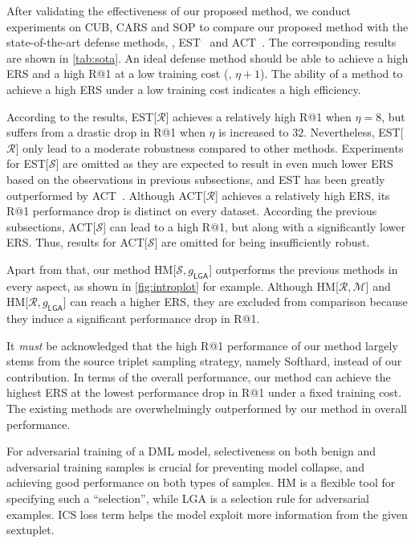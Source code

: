 \documentclass[10pt,twocolumn,letterpaper]{article}
\begin{document}
After validating the effectiveness of our proposed method, we conduct
experiments on CUB, CARS and SOP to compare our proposed method
with the state-of-the-art defense methods, \ie, EST~\cite{advrank}
and ACT~\cite{robrank}. The corresponding results are shown in \cref{tab:sota}.
%
An ideal defense method should be able to achieve a high ERS and a high R@1
at a low training cost (\ie, $\eta+1$).
%
The ability of a method to achieve a high ERS under a low training cost
indicates a high efficiency.

According to the results, EST[$\mathcal{R}$] achieves a relatively high R@1
when $\eta{=}8$, but suffers from a drastic drop in R@1 when $\eta$ is
increased to $32$.
%
Nevertheless, EST[$\mathcal{R}$] only lead to a moderate robustness
compared to other methods.
%
Experiments for EST[$\mathcal{S}$] are omitted as they are expected to result in
even much lower ERS based on the observations in previous subsections, and EST
has been greatly outperformed by ACT~\cite{robrank}.
%
Although ACT[$\mathcal{R}$] achieves a relatively high ERS, its R@1 performance
drop is distinct on every dataset.
%
According the previous subsections, ACT[$\mathcal{S}$] can lead to a high R@1,
but along with a significantly lower ERS.
%
Thus, results for ACT[$\mathcal{S}$] are omitted for being insufficiently robust.

Apart from that, our method HM[$\mathcal{S},g_\mathsf{LGA}$] outperforms the
previous methods in every aspect, as shown in \cref{fig:introplot} for 
example.
%
Although HM[$\mathcal{R},\mathcal{M}$] and HM[$\mathcal{R},g_\mathsf{LGA}$] can reach
a higher ERS, they are excluded from comparison because they induce a
significant performance drop in R@1.

It \emph{must} be acknowledged that the high R@1 performance of our method
largely stems from the source triplet sampling strategy, namely Softhard,
instead of our contribution.
%
In terms of the overall performance, our method can achieve the highest ERS at
the lowest performance drop in R@1 under a fixed training cost.
%
The existing methods are overwhelmingly outperformed by our method in overall
performance.

For adversarial training of a DML model, selectiveness on both benign and
adversarial training samples is crucial for preventing model collapse, and
achieving good performance on both types of samples.
%
HM is a flexible tool for specifying such a ``selection'',
while LGA is a selection rule for adversarial examples.
%
ICS loss term helps the model exploit more information from the
given sextuplet.
\end{document}
